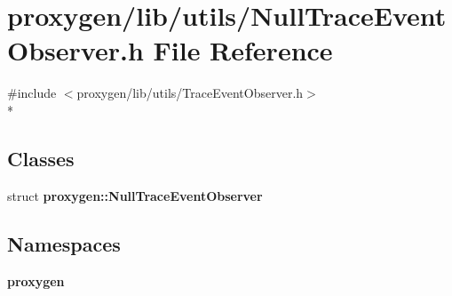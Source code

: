 \section{proxygen/lib/utils/\+Null\+Trace\+Event\+Observer.h File Reference}
\label{NullTraceEventObserver_8h}
{\ttfamily \#include $<$proxygen/lib/utils/\+Trace\+Event\+Observer.\+h$>$}\\*
\subsection*{Classes}
\begin{DoxyCompactItemize}
\item 
struct {\bf proxygen\+::\+Null\+Trace\+Event\+Observer}
\end{DoxyCompactItemize}
\subsection*{Namespaces}
\begin{DoxyCompactItemize}
\item 
 {\bf proxygen}
\end{DoxyCompactItemize}
